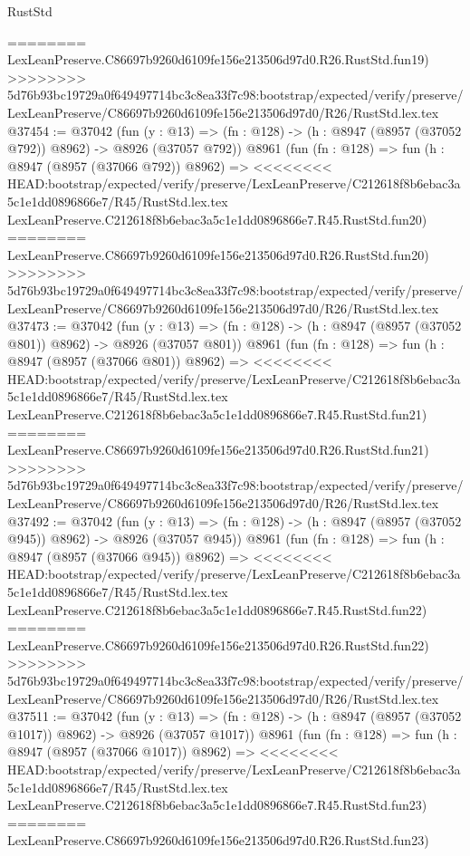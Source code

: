\begin{lexlean}{RustStd}
\begin{coremodule}
{\begin{coremodule}
{{{{{{{{{{{{{{{{{{{{{{{{{{{{{{{{{{{{{{{========
    LexLeanPreserve.C86697b9260d6109fe156e213506d97d0.R26.RustStd.fun19)
>>>>>>>> 5d76b93bc19729a0f649497714bc3c8ea33f7c98:bootstrap/expected/verify/preserve/LexLeanPreserve/C86697b9260d6109fe156e213506d97d0/R26/RustStd.lex.tex
@37454 := @37042
    (fun (y : @13) => (fn : @128) -> (h : @8947 (@8957 (@37052 @792)) @8962) -> @8926 (@37057 @792))
    @8961
    (fun (fn : @128) =>
    fun (h : @8947 (@8957 (@37066 @792)) @8962) =>
<<<<<<<< HEAD:bootstrap/expected/verify/preserve/LexLeanPreserve/C212618f8b6ebac3a5c1e1dd0896866e7/R45/RustStd.lex.tex
    LexLeanPreserve.C212618f8b6ebac3a5c1e1dd0896866e7.R45.RustStd.fun20)
========
    LexLeanPreserve.C86697b9260d6109fe156e213506d97d0.R26.RustStd.fun20)
>>>>>>>> 5d76b93bc19729a0f649497714bc3c8ea33f7c98:bootstrap/expected/verify/preserve/LexLeanPreserve/C86697b9260d6109fe156e213506d97d0/R26/RustStd.lex.tex
@37473 := @37042
    (fun (y : @13) => (fn : @128) -> (h : @8947 (@8957 (@37052 @801)) @8962) -> @8926 (@37057 @801))
    @8961
    (fun (fn : @128) =>
    fun (h : @8947 (@8957 (@37066 @801)) @8962) =>
<<<<<<<< HEAD:bootstrap/expected/verify/preserve/LexLeanPreserve/C212618f8b6ebac3a5c1e1dd0896866e7/R45/RustStd.lex.tex
    LexLeanPreserve.C212618f8b6ebac3a5c1e1dd0896866e7.R45.RustStd.fun21)
========
    LexLeanPreserve.C86697b9260d6109fe156e213506d97d0.R26.RustStd.fun21)
>>>>>>>> 5d76b93bc19729a0f649497714bc3c8ea33f7c98:bootstrap/expected/verify/preserve/LexLeanPreserve/C86697b9260d6109fe156e213506d97d0/R26/RustStd.lex.tex
@37492 := @37042
    (fun (y : @13) => (fn : @128) -> (h : @8947 (@8957 (@37052 @945)) @8962) -> @8926 (@37057 @945))
    @8961
    (fun (fn : @128) =>
    fun (h : @8947 (@8957 (@37066 @945)) @8962) =>
<<<<<<<< HEAD:bootstrap/expected/verify/preserve/LexLeanPreserve/C212618f8b6ebac3a5c1e1dd0896866e7/R45/RustStd.lex.tex
    LexLeanPreserve.C212618f8b6ebac3a5c1e1dd0896866e7.R45.RustStd.fun22)
========
    LexLeanPreserve.C86697b9260d6109fe156e213506d97d0.R26.RustStd.fun22)
>>>>>>>> 5d76b93bc19729a0f649497714bc3c8ea33f7c98:bootstrap/expected/verify/preserve/LexLeanPreserve/C86697b9260d6109fe156e213506d97d0/R26/RustStd.lex.tex
@37511 := @37042
    (fun (y : @13) =>
    (fn : @128) -> (h : @8947 (@8957 (@37052 @1017)) @8962) -> @8926 (@37057 @1017))
    @8961
    (fun (fn : @128) =>
    fun (h : @8947 (@8957 (@37066 @1017)) @8962) =>
<<<<<<<< HEAD:bootstrap/expected/verify/preserve/LexLeanPreserve/C212618f8b6ebac3a5c1e1dd0896866e7/R45/RustStd.lex.tex
    LexLeanPreserve.C212618f8b6ebac3a5c1e1dd0896866e7.R45.RustStd.fun23)
========
    LexLeanPreserve.C86697b9260d6109fe156e213506d97d0.R26.RustStd.fun23)
}}}}}}}}}}}}}}}}}}}}}}}}}}}}}}}}}}}}}}}
\end{coremodule}}
\end{coremodule}
\end{lexlean}
